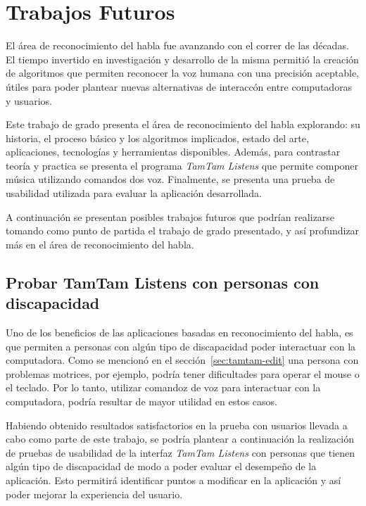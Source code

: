 \chapter{Trabajos Futuros}
\label{sec:trabajos-futuros}

El \'area de reconocimiento del habla fue avanzando con el correr de las d\'ecadas. El tiempo invertido
en investigaci\'on y desarrollo de la misma permiti\'o la creaci\'on de algoritmos que permiten
reconocer la voz humana con una precisi\'on aceptable, \'utiles para poder plantear nuevas alternativas
de interacc\'on entre computadoras y usuarios. 

Este trabajo de grado presenta el \'area de reconocimiento del habla explorando: su historia, el proceso
b\'asico y los algoritmos implicados, estado del arte, aplicaciones, tecnolog\'ias y herramientas disponibles.
Adem\'as, para contrastar teor\'ia y practica se presenta el programa \emph{TamTam Listens} que permite componer
m\'usica utilizando comandos dos voz. Finalmente, se presenta una prueba de usabilidad utilizada para evaluar la
aplicaci\'on desarrollada.

A continuaci\'on se presentan posibles trabajos futuros que podr\'ian realizarse tomando como punto de partida
el trabajo de grado presentado, y as\'i profundizar m\'as en el \'area de reconocimiento del habla.

\section{Probar TamTam Listens con personas con discapacidad}

Uno de los beneficios de las aplicaciones basadas en reconocimiento del habla, es que permiten a personas con alg\'un
tipo de discapacidad poder interactuar con la computadora. Como se mencion\'o en el secci\'on~\ref{sec:tamtam-edit}
una persona con problemas motrices, por ejemplo, podr\'ia tener dificultades para operar el mouse o el teclado. 
Por lo tanto, utilizar comandoz de voz para interactuar con la computadora, podr\'ia resultar de mayor utilidad
en estos casos.

Habiendo obtenido resultados satisfactorios en la prueba con usuarios llevada a cabo como parte de este trabajo, 
se podr\'ia plantear a continuaci\'on la realizaci\'on de pruebas de usabilidad de la interfaz \emph{TamTam Listens} 
con personas que tienen alg\'un tipo de discapacidad de modo a poder evaluar el desempe\~no de la aplicaci\'on. 
Esto permitir\'a identificar puntos a modificar en la aplicaci\'on y as\'i poder mejorar la experiencia del
usuario.

